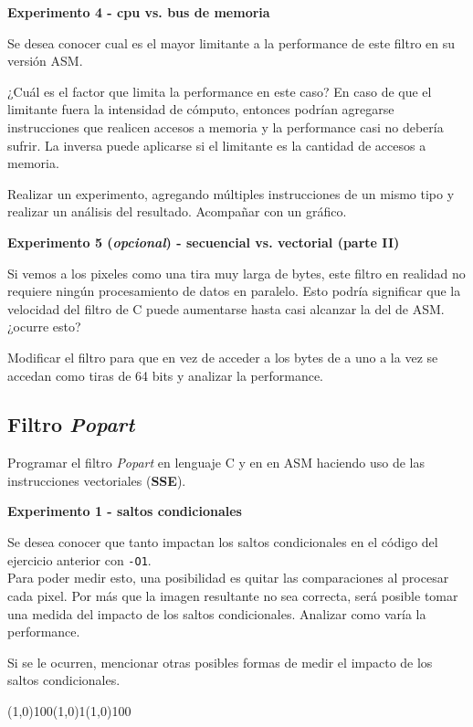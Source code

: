 \vspace*{0.3cm} \noindent
\textbf{Experimento 4 - cpu vs. bus de memoria}

	Se desea conocer cual es el mayor limitante a la performance de este filtro en su versión ASM.

	¿Cuál es el factor que limita la performance en este caso? En caso de que el limitante
	fuera la intensidad de cómputo, entonces podrían agregarse instrucciones que realicen
	accesos a memoria y la performance casi no debería sufrir. La inversa puede aplicarse
	si el limitante es la cantidad de accesos a memoria.
	
	Realizar un experimento, agregando múltiples instrucciones de un mismo tipo y realizar un análisis
	del resultado. Acompañar con un gráfico.

\vspace*{0.3cm} \noindent
\textbf{Experimento 5 (\textit{opcional}) - secuencial vs. vectorial (parte II)}

	Si vemos a los pixeles como una tira muy larga de bytes, este filtro en
	realidad no requiere ningún procesamiento de datos en paralelo. Esto podría
	significar que la velocidad del filtro de C puede aumentarse hasta casi
	alcanzar la del de ASM. ¿ocurre esto?
	
	Modificar el filtro para que en vez de acceder a los bytes de a uno a la vez
	se accedan como tiras de 64 bits y analizar la performance.


\subsection*{Filtro \textit{Popart}}

  Programar el filtro \textit{Popart} en lenguaje C y en en ASM haciendo uso de 
  las instrucciones vectoriales (\textbf{SSE}).

\vspace*{0.3cm} \noindent
\textbf{Experimento 1 - saltos condicionales}

	Se desea conocer que tanto impactan los saltos condicionales
	en el código del ejercicio anterior con \verb|-O1|.\\
	Para poder medir esto, una posibilidad es quitar las comparaciones
	al procesar cada pixel. Por más que la imagen resultante no sea correcta,
	será posible tomar una medida del impacto de los saltos condicionales.
	Analizar como varía la performance. 
	
	Si se le ocurren, mencionar otras posibles formas de medir el impacto de los 
  saltos condicionales.
\begin{center}
\line(1,0){100}\hspace{1em}\line(1,0){1}\hspace{1em}\line(1,0){100}
\end{center}
\vspace*{0.3cm} \noindent

